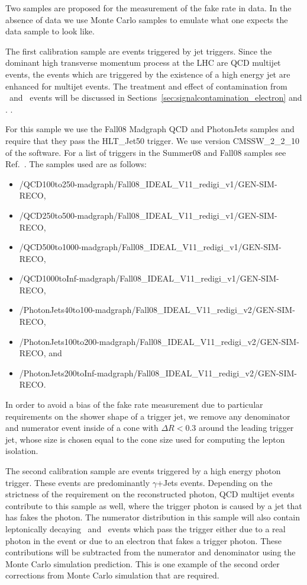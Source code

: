 \documentclass{cmspaper}
\begin{document}
Two samples are proposed for the measurement of the fake rate in data. In the absence of data we use Monte Carlo samples to emulate what one expects the data sample to look like.

\label{sec:jetTriggeredSample}
The first calibration sample are events triggered by jet triggers. Since the dominant high transverse momentum process at the LHC are QCD multijet events, the events which are triggered by the existence of a high energy jet are enhanced for multijet events. The treatment and effect of contamination from \WPM\ and \Z\ events will be discussed in Sections~\ref{sec:signalcontamination_electron} and .
.

For this sample we use the Fall08 Madgraph QCD and PhotonJets samples and require that they pass the HLT\_Jet50 trigger. We use version CMSSW\_2\_2\_10 of the software. For a list of triggers in the Summer08 and Fall08 samples see Ref.~\cite{HLTTable}. The samples used are as follows:
\begin{itemize}
\item /QCD100to250-madgraph/Fall08\_IDEAL\_V11\_redigi\_v1/GEN-SIM-RECO,
\item /QCD250to500-madgraph/Fall08\_IDEAL\_V11\_redigi\_v1/GEN-SIM-RECO,
\item /QCD500to1000-madgraph/Fall08\_IDEAL\_V11\_redigi\_v1/GEN-SIM-RECO,
\item /QCD1000toInf-madgraph/Fall08\_IDEAL\_V11\_redigi\_v1/GEN-SIM-RECO,
\item /PhotonJets40to100-madgraph/Fall08\_IDEAL\_V11\_redigi\_v2/GEN-SIM-RECO,
\item /PhotonJets100to200-madgraph/Fall08\_IDEAL\_V11\_redigi\_v2/GEN-SIM-RECO, and 
\item /PhotonJets200toInf-madgraph/Fall08\_IDEAL\_V11\_redigi\_v2/GEN-SIM-RECO.
\end{itemize}

In order to avoid a bias of the fake rate measurement due to particular requirements on the shower shape of a trigger jet, we remove any denominator and numerator event inside of a cone with $\Delta R < 0.3$ around the leading trigger jet, whose size is chosen equal to the cone size used for computing the lepton isolation. 

\label{sec:photonTriggeredSample}
The second calibration sample are events triggered by a high energy photon trigger. These events are predominantly $\gamma$+Jets events. Depending on the strictness of the requirement on the reconstructed photon, QCD multijet events contribute to this sample as well, where the trigger photon is caused by a jet that has fakes the photon. The numerator distribution in this sample will also contain leptonically decaying \WPM\ and \Z\ events which pass the trigger either due to a real photon in the event or due to an electron that fakes a trigger photon. These contributions will be subtracted from the numerator and denominator using the Monte Carlo simulation prediction. This is one example of the second order corrections from Monte Carlo simulation that are required.
\end{document}
